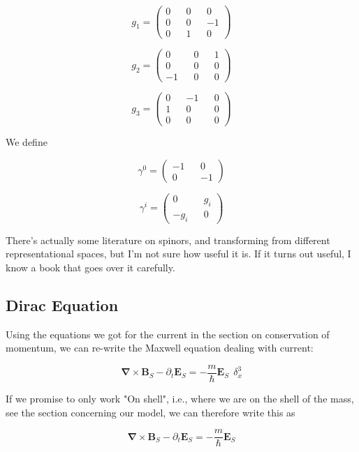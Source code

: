 \documentclass {article}
\renewcommand\vec{\mathbf}
\let\OldS\nabla
\renewcommand{\nabla}{\boldsymbol{\OldS}}
\begin{document}
$$g_1 = \left(\begin{matrix}  0 && 0 && 0 \\ 0 && 0 && -1 \\ 0 && 1 && 0 \end{matrix}\right) $$

$$g_2 = \left(\begin{matrix}  0 && 0 && 1 \\ 0 && 0 && 0 \\ -1 && 0 && 0 \end{matrix}\right) $$

$$g_3 = \left(\begin{matrix}  0 && -1 && 0 \\ 1 && 0 && 0 \\ 0 && 0 && 0 \end{matrix}\right) $$


We  define 

$$\gamma^0 = \left(\begin{matrix}  -1 && 0 \\ 0 && -1 \end{matrix}\right)$$

$$\gamma^i = \left(\begin{matrix}  0 && g_i \\ -g_i && 0 \end{matrix}\right)$$

There's actually some literature on spinors, and transforming from different representational spaces, but I'm not sure how useful it is. If it turns out useful, I know a book that goes over it carefully. 

\newpage

\subsection{Dirac Equation}



Using the equations we got for the current in the section on conservation of momentum, we can re-write the Maxwell equation dealing with current:

$$\nabla \times \vec B_S  - \partial_t \vec E_S  = - \frac m {\hbar} \vec E_S ~~ \delta^3_x$$

If we promise to only work "On shell", i.e., where we are on the shell of the mass, see the section concerning our model, we can therefore write this as

$$\nabla \times \vec B_S  - \partial_t \vec E_S  = - \frac m {\hbar} \vec E_S $$
\end{document}

